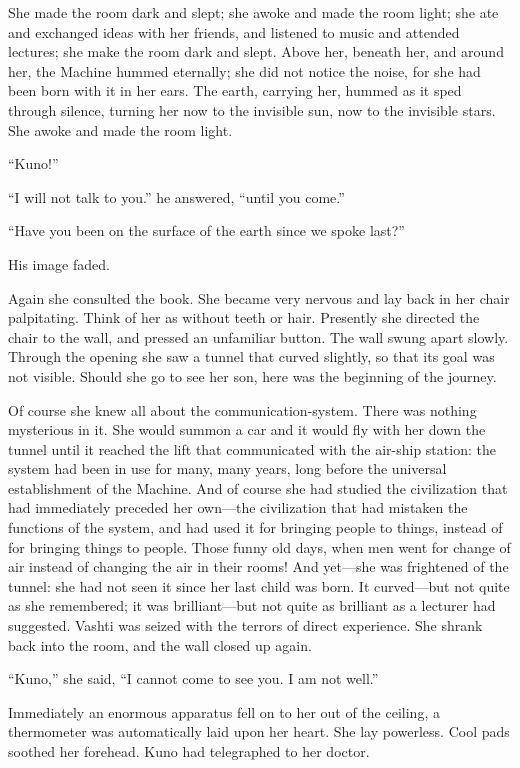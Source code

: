 She made the room dark and slept; she awoke and made the room light; she ate and exchanged ideas with her friends, and listened to music and attended lectures; she make the room dark and slept. Above her, beneath her, and around her, the Machine hummed eternally; she did not notice the noise, for she had been born with it in her ears. The earth, carrying her, hummed as it sped through silence, turning her now to the invisible sun, now to the invisible stars. She awoke and made the room light.

``Kuno!''

``I will not talk to you.'' he answered, ``until you come.''

``Have you been on the surface of the earth since we spoke last?''

His image faded.

Again she consulted the book. She became very nervous and lay back in her chair palpitating. Think of her as without teeth or hair. Presently she directed the chair to the wall, and pressed an unfamiliar button. The wall swung apart slowly. Through the opening she saw a tunnel that curved slightly, so that its goal was not visible. Should she go to see her son, here was the beginning of the journey.

Of course she knew all about the communication-system. There was nothing mysterious in it. She would summon a car and it would fly with her down the tunnel until it reached the lift that communicated with the air-ship station: the system had been in use for many, many years, long before the universal establishment of the Machine. And of course she had studied the civilization that had immediately preceded her own---the civilization that had mistaken the functions of the system, and had used it for bringing people to things, instead of for bringing things to people. Those funny old days, when men went for change of air instead of changing the air in their rooms! And yet---she was frightened of the tunnel: she had not seen it since her last child was born. It curved---but not quite as she remembered; it was brilliant---but not quite as brilliant as a lecturer had suggested. Vashti was seized with the terrors of direct experience. She shrank back into the room, and the wall closed up again.

``Kuno,'' she said, ``I cannot come to see you. I am not well.''

Immediately an enormous apparatus fell on to her out of the ceiling, a thermometer was automatically laid upon her heart. She lay powerless. Cool pads soothed her forehead. Kuno had telegraphed to her doctor.

